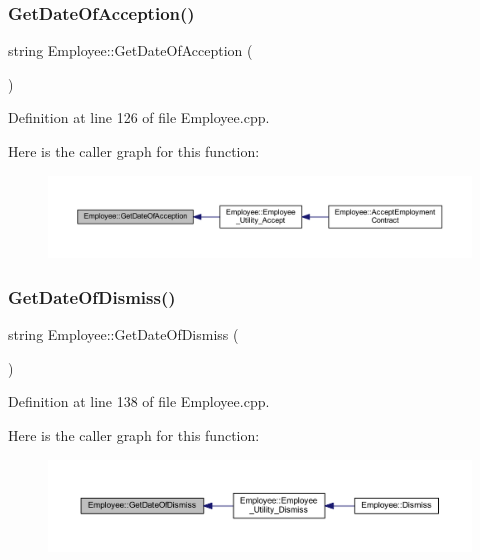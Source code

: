 \subsubsection{\texorpdfstring{Get\+Date\+Of\+Acception()}{GetDateOfAcception()}}
{\footnotesize\ttfamily string Employee\+::\+Get\+Date\+Of\+Acception (\begin{DoxyParamCaption}{ }\end{DoxyParamCaption})}



Definition at line 126 of file Employee.\+cpp.

Here is the caller graph for this function\+:
\nopagebreak
\begin{figure}[H]
\begin{center}
\leavevmode
\includegraphics[width=350pt]{class_employee_ad8df9b482bc23365e06357005524c5fd_icgraph}
\end{center}
\end{figure}
\mbox{\label{class_employee_a9bf98793dad6f452b3b99b353a4a6635}} 
\subsubsection{\texorpdfstring{Get\+Date\+Of\+Dismiss()}{GetDateOfDismiss()}}
{\footnotesize\ttfamily string Employee\+::\+Get\+Date\+Of\+Dismiss (\begin{DoxyParamCaption}{ }\end{DoxyParamCaption})}



Definition at line 138 of file Employee.\+cpp.

Here is the caller graph for this function\+:
\nopagebreak
\begin{figure}[H]
\begin{center}
\leavevmode
\includegraphics[width=350pt]{class_employee_a9bf98793dad6f452b3b99b353a4a6635_icgraph}
\end{center}
\end{figure}
\mbox{\label{class_employee_a7782178746f3640942450a0f7271ef60}} 

